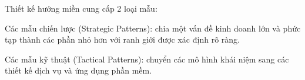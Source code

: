 
Thiết kế hướng miền cung cấp 2 loại mẫu:  

Các mẫu chiến lược (Strategic Patterns): chia một vấn đề kinh doanh lớn và phức tạp thành các phần nhỏ hơn với ranh giới được xác định rõ ràng.


Các mẫu kỹ thuật (Tactical Patterns): chuyển các mô hình khái niệm sang các thiết kế dịch vụ và ứng dụng phần mềm.





